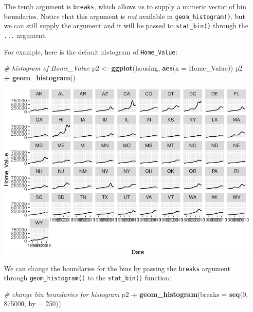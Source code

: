 \documentclass[
]{book}
\newenvironment{Shaded}{\begin{snugshade}}{\end{snugshade}}
\newcommand{\CommentTok}[1]{\textcolor[rgb]{0.56,0.35,0.01}{\textit{#1}}}
\newcommand{\DataTypeTok}[1]{\textcolor[rgb]{0.13,0.29,0.53}{#1}}
\newcommand{\DecValTok}[1]{\textcolor[rgb]{0.00,0.00,0.81}{#1}}
\newcommand{\KeywordTok}[1]{\textcolor[rgb]{0.13,0.29,0.53}{\textbf{#1}}}
\newcommand{\NormalTok}[1]{#1}
\newcommand{\OperatorTok}[1]{\textcolor[rgb]{0.81,0.36,0.00}{\textbf{#1}}}
\newcommand{\StringTok}[1]{\textcolor[rgb]{0.31,0.60,0.02}{#1}}
\begin{document}
The tenth argument is \texttt{breaks}, which allows us to supply a numeric vector of bin boundaries. Notice that this argument is \emph{not} available in \texttt{geom\_histogram()}, but we can still supply the argument and it will be passed to \texttt{stat\_bin()} through the \texttt{...} argument.

For example, here is the default histogram of \texttt{Home\_Value}:

\begin{Shaded}
\begin{Highlighting}[]
\CommentTok{\# histogram of \textasciigrave{}Home\_Value\textasciigrave{}}
\NormalTok{p2 \textless{}{-}}\StringTok{ }\KeywordTok{ggplot}\NormalTok{(housing, }\KeywordTok{aes}\NormalTok{(}\DataTypeTok{x =}\NormalTok{ Home\_Value))}
\NormalTok{p2 }\OperatorTok{+}\StringTok{ }\KeywordTok{geom\_histogram}\NormalTok{()}
\end{Highlighting}
\end{Shaded}

\includegraphics{R/Rgraphics/figures/unnamed-chunk-181-1.pdf}

We can change the boundaries for the bins by passing the \texttt{breaks} argument through \texttt{geom\_histogram()} to the \texttt{stat\_bin()} function:

\begin{Shaded}
\begin{Highlighting}[]
\CommentTok{\# change bin boundaries for histogram}
\NormalTok{p2 }\OperatorTok{+}\StringTok{ }\KeywordTok{geom\_histogram}\NormalTok{(}\DataTypeTok{breaks =} \KeywordTok{seq}\NormalTok{(}\DecValTok{0}\NormalTok{, }\DecValTok{875000}\NormalTok{, }\DataTypeTok{by =} \DecValTok{250}\NormalTok{))}
\end{Highlighting}
\end{Shaded}
\end{document}
